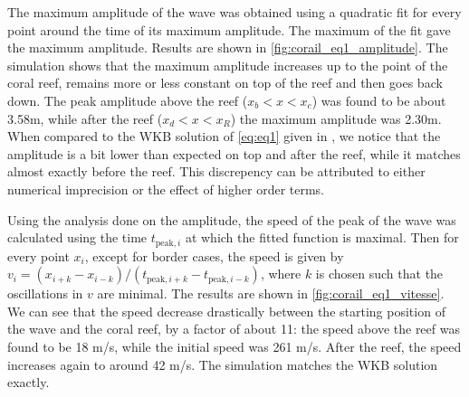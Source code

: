 The maximum amplitude of the wave was obtained using a quadratic fit for every point around the time of its maximum amplitude. The maximum of the fit gave the maximum amplitude. Results are shown in \autoref{fig:corail_eq1_amplitude}. The simulation shows that the maximum amplitude increases up to the point of the coral reef, remains more or less constant on top of the reef and then goes back down. The peak amplitude above the reef (\(x_b < x < x_c\)) was found to be about 3.58m, while after the reef (\(x_d<x<x_R\)) the maximum amplitude was 2.30m. When compared to the WKB solution of \autoref{eq:eq1} given in \cite{physnumbook}, we notice that the amplitude is a bit lower than expected on top and after the reef, while it matches almost exactly before the reef. This discrepency can be attributed to either numerical imprecision or the effect of higher order terms.

Using the analysis done on the amplitude, the speed of the peak of the wave was calculated using the time \(t_{\textrm{peak},i}\) at which the fitted function is maximal. Then for every point \(x_i\), except for border cases, the speed is given by \(v_i = (x_{i+k} - x_{i-k})/(t_{\textrm{peak},i+k} - t_{\textrm{peak},i-k})\), where \(k\) is chosen such that the oscillations in \(v\) are minimal. The results are shown in \autoref{fig:corail_eq1_vitesse}. We can see that the speed decrease drastically between the starting position of the wave and the coral reef, by a factor of about 11: the speed above the reef was found to be 18 m/s, while the initial speed was 261 m/s. After the reef, the speed increases again to around 42 m/s. The simulation matches the WKB solution exactly.

